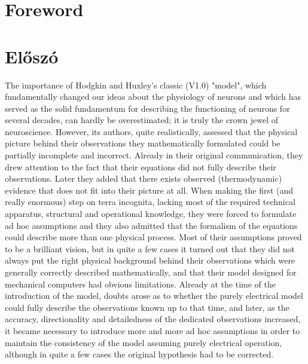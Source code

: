 
\ifx\magyar\undefined
\chapter*{Foreword\label{ch:Foreword}}
\else
\chapter*{Előszó\label{ch:Foreword}}
\fi

\ifx\magyar\undefined 
The importance of Hodgkin and Huxley's classic (V1.0) "model", which fundamentally changed our ideas about the physiology of neurons and which has served as the solid fundamentum for describing the functioning of neurons for several decades, can hardly be overestimated; it is truly the crown jewel of neuroscience. However, its authors, quite realistically, assessed that the physical picture behind their observations they mathematically formulated could be partially incomplete and incorrect. Already in their original communication, they drew attention to the fact that their equations did not fully describe their observations. Later they added that there exists observed (thermodynamic) evidence
that does not fit into their picture at all.
When making the first (and really enormous) step on terra incognita, lacking most of the required technical apparatus, structural and operational knowledge,
they were forced to formulate ad hoc assumptions and they also admitted that the formalism of the equations could describe more than one physical process.
Most of their assumptions proved to be a brilliant vision, but in quite a few cases it turned out that they did not always put the right physical background behind their observations
which were generally correctly described mathematically, and that their model designed for mechanical computers had obvious limitations.
Already at the time of the introduction of the model, doubts arose as to whether the purely electrical model could fully describe the observations known up to that time, and later, as the accuracy, directionality and detailedness of the dedicated observations increased, it became necessary to introduce more and more ad hoc assumptions in order to maintain the consistency of the model assuming purely electrical operation,
although in quite a few cases the original hypothesis had to be corrected.

